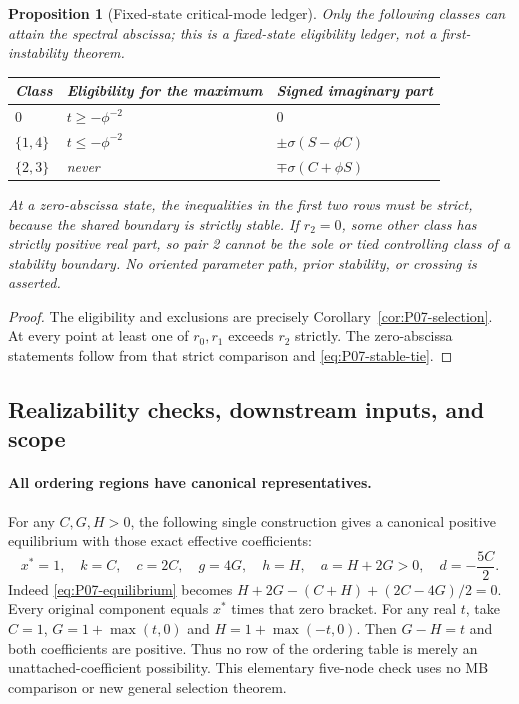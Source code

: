 \documentclass[11pt]{article}
\newtheorem{proposition}[theorem]{Proposition}
\theoremstyle{definition}
\theoremstyle{remark}
\begin{document}
\begin{proposition}[Fixed-state critical-mode ledger]
\label{prop:P07-ledger}
Only the following classes can attain the spectral abscissa; this is a
fixed-state eligibility ledger, not a first-instability theorem.
\begin{center}
\begin{tabular}{@{}l l l@{}}
\toprule
Class&Eligibility for the maximum&Signed imaginary part\\
\midrule
$0$&$t\ge-\phi^{-2}$&$0$\\
$\{1,4\}$&$t\le-\phi^{-2}$&$\pm\sigma(S-\phi C)$\\
$\{2,3\}$&never&$\mp\sigma(C+\phi S)$\\
\bottomrule
\end{tabular}
\end{center}
At a zero-abscissa state, the inequalities in the first two rows must
be strict, because the shared boundary is strictly stable.
If $r_2=0$, some other class has strictly positive real part, so pair 2
cannot be the sole or tied controlling class of a stability boundary.
No oriented parameter path, prior stability, or crossing is asserted.
\end{proposition}
\begin{proof}
The eligibility and exclusions are precisely
Corollary~\ref{cor:P07-selection}. At every point at least one of
$r_0,r_1$ exceeds $r_2$ strictly. The zero-abscissa statements follow
from that strict comparison and \eqref{eq:P07-stable-tie}.
\end{proof}

\subsection{Realizability checks, downstream inputs, and scope}
\paragraph{All ordering regions have canonical representatives.}
For any $C,G,H>0$, the following single construction gives a canonical
positive equilibrium with those exact effective coefficients:
\begin{equation}
 x^*=1,\quad k=C,\quad c=2C,\quad g=4G,\quad h=H,
 \quad a=H+2G>0,\quad d=-\frac{5C}{2}.
 \label{eq:P07-realization}
\end{equation}
Indeed \eqref{eq:P07-equilibrium} becomes
$H+2G-(C+H)+(2C-4G)/2=0$. Every original component equals
$x^*$ times that zero bracket. For any real $t$, take $C=1$,
$G=1+\max(t,0)$ and $H=1+\max(-t,0)$. Then $G-H=t$ and both
coefficients are positive. Thus no row of the ordering table is merely
an unattached-coefficient possibility. This elementary five-node check
uses no MB comparison or new general selection theorem.
\end{document}
